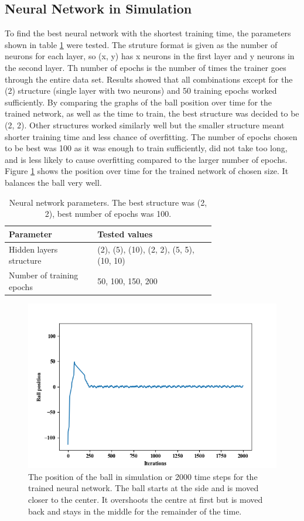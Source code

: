 \documentclass[12pt,a4paper]{article}
\begin{document}
\subsection{Neural Network in Simulation}
To find the best neural network with the shortest training time, the parameters shown in table \ref{nn_params} were tested. The struture format is given as the number of neurons for each layer, so (x, y) has x neurons in the first layer and y neurons in the second layer. Th number of epochs is the number of times the trainer goes through the entire data set. Results showed that all combinations except for the (2) structure (single layer with two neurons) and 50 training epochs worked sufficiently. By comparing the graphs of the ball position over time for the trained network, as well as the time to train, the best structure was decided to be (2, 2). Other structures worked similarly well but the smaller structure meant shorter training time and less chance of overfitting. The number of epochs chosen to be best was 100 as it was enough to train sufficiently, did not take too long, and is less likely to cause overfitting compared to the larger number of epochs. Figure \ref{nn_param_test} shows the position over time for the trained network of chosen size. It balances the ball very well.
\begin{table}[htb]
\centering
\caption{Neural network parameters. The best structure was (2, 2), best number of epochs was 100.}
\label{nn_params}
\begin{tabular}{>{\raggedright}p{0.3\linewidth}p{0.4\linewidth}}\hline
Parameter & Tested values\\ \hline\hline
Hidden layers structure & (2), (5), (10), (2, 2), (5, 5), (10, 10)\\ \hline
Number of training epochs & 50, 100, 150, 200\\ \hline
\end{tabular}
\end{table}

\begin{figure}[H]
	\includegraphics{86_nn}
	\caption{The position of the ball in simulation or 2000 time steps for the trained neural network. The ball starts at the side and is moved closer to the center. It overshoots the centre at first but is moved back and stays in the middle for the remainder of the time.}
	\label{nn_param_test}
\end{figure}
\end{document}
